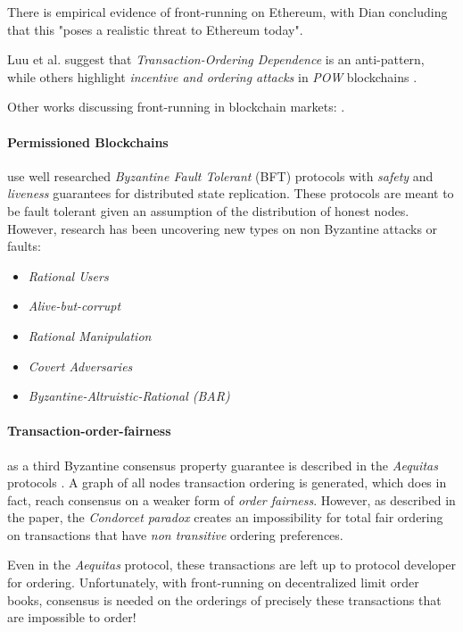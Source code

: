 \documentclass[12pt]{article}
\begin{document}
There is empirical evidence of front-running on Ethereum, with Dian concluding that this "poses a realistic threat to Ethereum today". \cite{Daian} 

Luu et al. \cite{Luu} suggest that \emph{Transaction-Ordering Dependence} is an anti-pattern, while others highlight \emph{incentive and ordering attacks} in \emph{POW} blockchains \cite{Judmayer} \cite{Delmolino}. 

Other works discussing front-running in blockchain markets: \cite{Malinova,Eskandari,Clark,Berg}.

\paragraph{Permissioned Blockchains} use well researched \emph{Byzantine Fault Tolerant} (BFT) protocols with \emph{safety} and \emph{liveness} guarantees for distributed state replication. \cite{Gueta} These protocols are meant to be fault tolerant given an assumption of the distribution of honest nodes. However, research has been uncovering new types on non Byzantine attacks or faults:      
\begin{center}
\begin{itemize}{}
  \item \emph{Rational Users} \cite{Hou}
  \item \emph{Alive-but-corrupt} \cite{Malkhi}
  \item \emph{Rational Manipulation} \cite{Shneidman}
  \item \emph{Covert Adversaries} \cite{Aumann}
  \item \emph{Byzantine-Altruistic-Rational (BAR)} \cite{Aiyer}
\end{itemize}
\end{center}

\paragraph{Transaction-order-fairness} as a third Byzantine consensus property guarantee is described in the \emph{Aequitas} protocols \cite{Kelkar_2020}. A graph of all nodes transaction ordering is generated, which does in fact, reach consensus on a weaker form of \emph{order fairness}. However, as described in the paper, the \emph{Condorcet paradox} creates an impossibility for total fair ordering on transactions that have \emph{non transitive} ordering preferences. 

Even in the \emph{Aequitas} protocol, these transactions are left up to protocol developer for ordering. Unfortunately, with front-running on decentralized limit order books, consensus is needed on the orderings of precisely these transactions that are impossible to order! 
\end{document}
